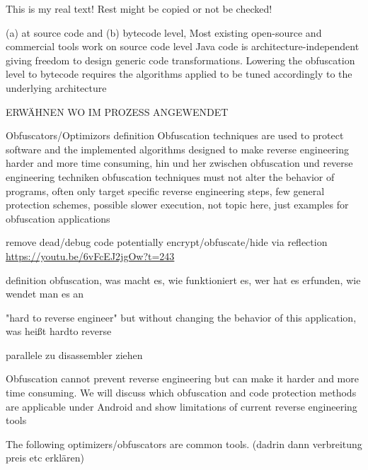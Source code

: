 This is my real text! Rest might be copied or not be checked!

%
(a) at source code and (b) bytecode level, Most existing open-source and commercial tools work on source code level\newline
Java code is architecture-independent giving freedom to design generic code transformations. Lowering the obfuscation level to bytecode requires the algorithms applied to be tuned accordingly to the underlying architecture\newline
\cite{kovachevaMaster}
%


ERWÄHNEN WO IM PROZESS ANGEWENDET\newline


Obfuscators/Optimizors definition\newline
Obfuscation techniques are used to protect software and the implemented algorithms\newline
designed to make reverse engineering harder and more time consuming, hin und her zwischen obfuscation und reverse engineering techniken\newline
obfuscation techniques must not alter the behavior of programs, often only target specific reverse engineering steps, few general protection schemes, possible slower execution, not topic here, just examples for obfuscation applications

remove dead/debug code\newline
potentially encrypt/obfuscate/hide via reflection\newline
\url{https://youtu.be/6vFcEJ2jgOw?t=243}\newline

definition obfuscation, was macht es, wie funktioniert es, wer hat es erfunden, wie wendet man es an\newline

"hard to reverse engineer" but without changing the behavior of this
application, was heißt hardto reverse\newline

parallele zu disassembler ziehen\newline

Obfuscation cannot prevent reverse engineering but can make it harder and more time consuming. We will discuss which obfuscation and code protection methods are applicable under Android and show limitations of current reverse engineering tools\newline

The following optimizers/obfuscators are common tools. (dadrin dann verbreitung preis etc erklären)
